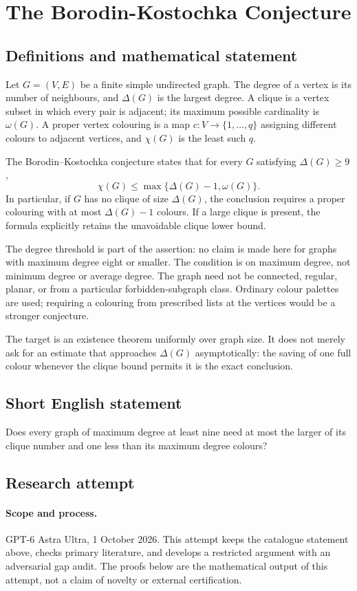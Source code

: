 \documentclass[11pt,a4paper]{article}
\begin{document}
\section*{The Borodin-Kostochka Conjecture}\label{statement}

\subsection{Definitions and mathematical statement}
Let $G=(V,E)$ be a finite simple undirected graph. The degree of a
vertex is its number of neighbours, and $\Delta(G)$ is the largest
degree. A clique is a vertex subset in which every pair is adjacent;
its maximum possible cardinality is $\omega(G)$.
A proper vertex colouring is a map $c:V\to\{1,\ldots,q\}$ assigning
different colours to adjacent vertices, and $\chi(G)$ is the least
such $q$.

The Borodin--Kostochka conjecture states that for every $G$ satisfying
$\Delta(G)\ge9$,
\[
 \chi(G)\le\max\{\Delta(G)-1,\omega(G)\}.
\]
In particular, if $G$ has no clique of size $\Delta(G)$, the conclusion
requires a proper colouring with at most $\Delta(G)-1$ colours. If a
large clique is present, the formula explicitly retains the unavoidable
clique lower bound.

The degree threshold is part of the assertion: no claim is made here
for graphs with maximum degree eight or smaller. The condition is on
maximum degree, not minimum degree or average degree. The graph need
not be connected, regular, planar, or from a particular forbidden-subgraph
class. Ordinary colour palettes are used; requiring a colouring from
prescribed lists at the vertices would be a stronger conjecture.

The target is an existence theorem uniformly over graph size. It does
not merely ask for an estimate that approaches $\Delta(G)$ asymptotically:
the saving of one full colour whenever the clique bound permits it is
the exact conclusion.
\subsection{Short English statement}
Does every graph of maximum degree at least nine need at most the larger of its clique number and one less than its maximum degree colours?
\subsection{Research attempt}
\paragraph{Scope and process.}
GPT-6 Astra Ultra, 1 October 2026. This attempt keeps the catalogue statement above, checks primary literature, and develops a restricted argument with an adversarial gap audit. The proofs below are the mathematical output of this attempt, not a claim of novelty or external certification.
\end{document}
